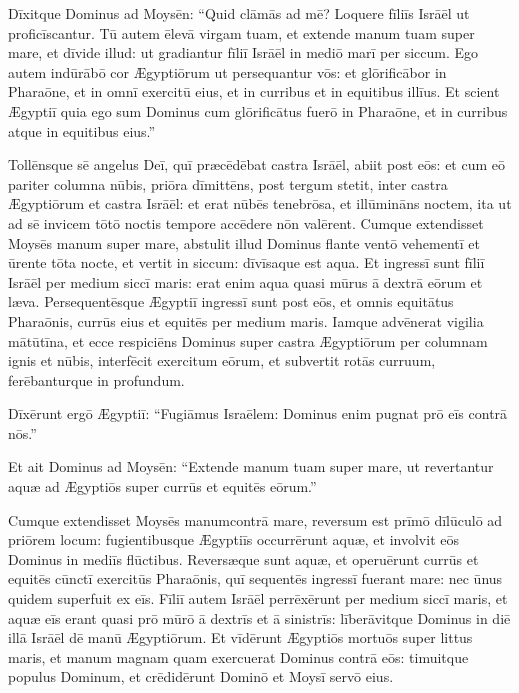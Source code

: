 Dīxitque Dominus ad Moysēn: ``Quid clāmās ad mē? Loquere
fīliīs Isrāēl ut proficīscantur. Tū autem ēlevā virgam tuam, et extende manum tuam super mare, et dīvide illud:
ut gradiantur fīliī Isrāēl in mediō marī per siccum. Ego autem
indūrābō cor Ægyptiōrum ut persequantur vōs: et glōrificābor in Pharaōne,
et in omnī exercitū eius, et in curribus et in equitibus illīus. Et
scient Ægyptiī quia ego sum Dominus cum glōrificātus fuerō
in Pharaōne, et in curribus atque in equitibus eius.''

Tollēnsque sē
angelus 
Deī, quī præcēdēbat castra Isrāēl, abiit post eōs:
et cum eō pariter columna nūbis, priōra dīmittēns,
post tergum stetit, inter castra Ægyptiōrum et castra Isrāēl: et erat
nūbēs tenebrōsa, et illūmināns noctem, ita
ut ad sē invicem tōtō noctis tempore accēdere nōn valērent.
Cumque extendisset Moysēs manum super mare, abstulit illud Dominus
flante ventō vehementī et ūrente
tōta nocte, et vertit in siccum: dīvīsaque est aqua. Et
ingressī sunt fīliī Isrāēl per medium siccī maris:
erat enim aqua quasi mūrus ā dextrā eōrum et læva. Persequentēsque
Ægyptiī ingressī sunt post eōs, et omnis equitātus Pharaōnis, currūs eius
et equitēs per medium maris. Iamque advēnerat vigilia
mātūtīna, et ecce respiciēns Dominus super castra Ægyptiōrum per columnam ignis et
nūbis, interfēcit exercitum eōrum, et subvertit
rotās curruum, ferēbanturque in profundum.

Dīxērunt ergō Ægyptiī: ``Fugiāmus Israēlem: Dominus enim
pugnat prō eīs contrā nōs.''

Et ait Dominus ad Moysēn: ``Extende manum tuam
super mare, ut revertantur aquæ ad Ægyptiōs super currūs et equitēs
eōrum.''

Cumque extendisset Moysēs manum\linebreak contrā mare, reversum est prīmō
dīlūculō ad priōrem locum: fugientibusque
Ægyptiīs occurrērunt aquæ, et involvit eōs Dominus in
mediīs flūctibus. Reversæque sunt aquæ, et operuērunt currūs et equitēs
cūnctī exercitūs Pharaōnis, quī sequentēs ingressī fuerant mare: nec ūnus
quidem superfuit ex eīs. Fīliī autem Isrāēl perrēxērunt per medium siccī
maris, et aquæ eīs erant quasi prō mūrō ā dextrīs et ā sinistrīs: 
līberāvitque Dominus in diē illā Isrāēl dē manū Ægyptiōrum. 
Et vīdērunt
Ægyptiōs mortuōs super littus maris, et manum magnam quam
exercuerat Dominus contrā eōs: timuitque populus Dominum, et crēdidērunt
Dominō et Moysī servō eius.
